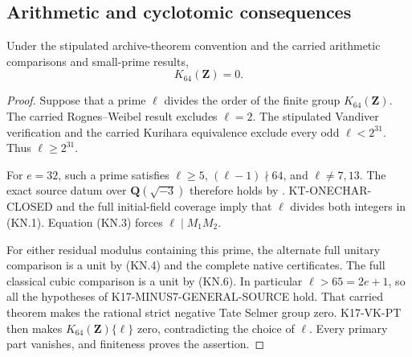 \subsection{Arithmetic and cyclotomic consequences}

\begin{theorem}[KT-K64-VANISH]
\label{thm:kt-k64-vanish}
Under the stipulated archive-theorem convention and the carried
arithmetic comparisons and small-prime results,
\[
                              K_{64}(\mathbf Z)=0.
\]
\end{theorem}
\begin{proof}
Suppose that a prime $\ell$ divides the order of the finite
group $K_{64}(\mathbf Z)$.  The carried Rognes--Weibel result
excludes $\ell=2$.  The stipulated Vandiver verification and
the carried Kurihara equivalence exclude every odd
$\ell<2^{31}$.  Thus $\ell\geq2^{31}$.

For $e=32$, such a prime satisfies $\ell\geq5$,
$(\ell-1)\nmid64$, and $\ell\ne7,13$.  The exact source
datum over $\mathbf Q(\sqrt{-3})$ therefore holds by
.  KT-ONECHAR-CLOSED and
the full initial-field coverage imply that $\ell$ divides
both integers in (KN.1).  Equation (KN.3) forces
$\ell\mid M_1M_2$.

For either residual modulus containing this prime, the
alternate full unitary comparison is a unit by (KN.4)
and the complete native certificates.  The full classical
cubic comparison is a unit by (KN.6).  In particular
$\ell>65=2e+1$, so all the hypotheses of
K17-MINUS7-GENERAL-SOURCE hold.  That carried theorem makes
the rational strict negative Tate Selmer group zero.
K17-VK-PT then makes $K_{64}(\mathbf Z)\{\ell\}$ zero,
contradicting the choice of $\ell$.  Every primary part
vanishes, and finiteness proves the assertion.
\end{proof}

